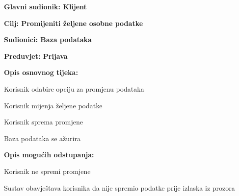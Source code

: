 					\noindent {}
					\begin{packed_item}
	
						\item \textbf{Glavni sudionik: Klijent}
						\item  \textbf{Cilj: Promijeniti željene osobne podatke}
						\item  \textbf{Sudionici: Baza podataka}
						\item  \textbf{Preduvjet: Prijava } 
						\item  \textbf{Opis osnovnog tijeka:}
						
						\item[] \begin{packed_enum}
	
							\item Korisnik odabire opciju za promjenu podataka
					
							\item Korisnik mijenja željene podatke
							\item Korisnik sprema promjene
							\item Baza podataka se ažurira
						\end{packed_enum}
						
						\item  \textbf{Opis mogućih odstupanja:}
						
						\item[] \begin{packed_item}
	
							\item[3.a] Korisnik ne spremi promjene
							\item[] \begin{packed_enum}
								
								\item Sustav obavještava korisnika da nije spremio podatke prije izlaska
iz prozora
								
							\end{packed_enum}
						\end{packed_item}
					\end{packed_item}
					
